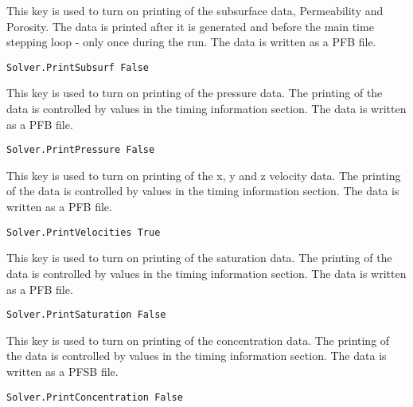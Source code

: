 {
This key is used to turn on printing of the subsurface data,
Permeability and Porosity.  The data is printed after it is
generated and before the main time stepping loop - only once
during the run.  The data is written as a PFB file.
}
\begin{display}\begin{verbatim}
Solver.PrintSubsurf False
\end{verbatim}\end{display}

{
This key is used to turn on printing of the pressure data.
The printing of the data is controlled by values in the
timing information section.  The data is written as a PFB
file.
}
\begin{display}\begin{verbatim}
Solver.PrintPressure False
\end{verbatim}\end{display}

{
This key is used to turn on printing of the x, y and z
velocity data.  The printing of the data is controlled by
values in the timing information section.  The data is
written as a PFB file.
}
\begin{display}\begin{verbatim}
Solver.PrintVelocities True
\end{verbatim}\end{display}

{
This key is used to turn on printing of the saturation data.
The printing of the data is controlled by values in the
timing information section.  The data is written as a PFB file.
}
\begin{display}\begin{verbatim}
Solver.PrintSaturation False
\end{verbatim}\end{display}

{
This key is used to turn on printing of the concentration data.
The printing of the data is controlled by values in the
timing information section.  The data is written as a PFSB file.
}
\begin{display}\begin{verbatim}
Solver.PrintConcentration False
\end{verbatim}\end{display}

